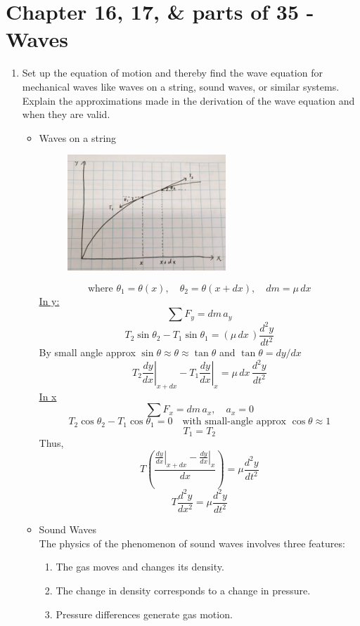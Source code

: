 \documentclass[12pt]{article}
\begin{document}
\section*{Chapter 16, 17, \& parts of 35 - Waves}
\begin{enumerate}
    \item Set up the equation of motion and thereby find the wave equation for mechanical waves like waves on a string, sound waves, or similar systems. Explain the approximations made in the derivation of the wave equation and when they are valid.
\begin{itemize}
    \item Waves on a string
\begin{figure}[H]
    \centering
    \includegraphics[width=0.6\textwidth]{String.jpg}
\end{figure}
\[
\text{where }\theta_1 = \theta(x), \quad \theta_2 = \theta(x+dx), \quad dm = \mu \, dx 
\]
\underline{In y:}
\[
\sum F_y = dm \, a_y
\]
\[
T_2 \sin \theta_2 - T_1 \sin \theta_1 = (\mu \, dx \,) \frac{d^2 y}{dt^2}
\]
By small angle approx $\sin \theta \approx \theta \approx \tan \theta$ and $\tan \theta = dy/dx$
\[
T_2 \left.\frac{dy}{dx}\right|_{x+dx} - T_1 \left.\frac{dy}{dx}\right|_{x} = \mu \, dx \, \frac{d^2 y}{dt^2}
\]
\underline{In x}
\[
\sum F_x = dm \, a_x, \quad a_x = 0
\]
\[
T_2 \cos \theta_2 - T_1 \cos \theta_1 = 0 
\quad \text{with small-angle approx } \cos \theta \approx 1
\]
\[
T_1 = T_2
\]
Thus,
\[
T \left( \frac{\left.\frac{dy}{dx}\right|_{x+dx} - \left.\frac{dy}{dx}\right|_{x}}{dx} \right) = \mu \frac{d^2 y}{dt^2}
\]
\[
\boxed{T \frac{d^2 y}{dx^2} = \mu \frac{d^2 y}{dt^2}}
\]
    \item Sound Waves
\\The physics of the phenomenon of sound waves involves three features:
\begin{enumerate}
    \item The gas moves and changes its density.
    \item The change in density corresponds to a change in pressure.
    \item Pressure differences generate gas motion.
\end{enumerate}


\end{itemize}
\end{enumerate}
\end{document}
